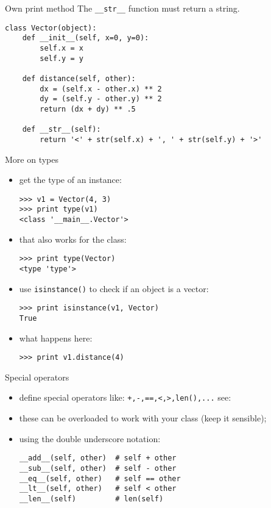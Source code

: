 \documentclass{beamer}
\begin{document}
\begin{frame}[fragile]{Own print method}
The \texttt{__str__} function must return a string.

\begin{verbatim}
class Vector(object):
    def __init__(self, x=0, y=0):
        self.x = x
        self.y = y

    def distance(self, other):
        dx = (self.x - other.x) ** 2
        dy = (self.y - other.y) ** 2
        return (dx + dy) ** .5

    def __str__(self):
        return '<' + str(self.x) + ', ' + str(self.y) + '>'
\end{verbatim}
\end{frame}

\begin{frame}[fragile]{More on types}
\begin{itemize}
\item get the type of an instance:
\begin{verbatim}
>>> v1 = Vector(4, 3)
>>> print type(v1)
<class '__main__.Vector'>
\end{verbatim}

\item that also works for the class:
\begin{verbatim}
>>> print type(Vector)
<type 'type'>
\end{verbatim}

\item use \texttt{isinstance()} to check if an object is a
vector:
\begin{verbatim}
>>> print isinstance(v1, Vector)
True
\end{verbatim}

\item what happens here:
\begin{verbatim}
>>> print v1.distance(4)
\end{verbatim}
\end{itemize}
\end{frame}

\begin{frame}[fragile]{Special operators}
\begin{itemize}
\item define special operators like:
\texttt{+,-,==,<,>,len(),...}
see: 

\item these can be \textcolor{pms280_compl}{overloaded} to work with your
class (keep it sensible);
\item using the double underscore notation:
\begin{verbatim}
__add__(self, other)  # self + other
__sub__(self, other)  # self - other
__eq__(self, other)   # self == other
__lt__(self, other)   # self < other
__len__(self)         # len(self)
\end{verbatim}
\end{itemize}
\end{frame}
\end{document}
